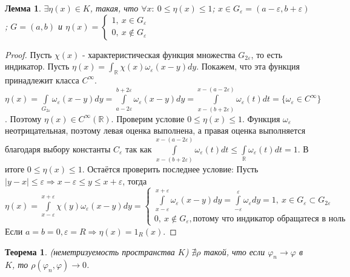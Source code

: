 \documentclass[9pt, a4paper]{article}
\newtheorem*{theorem}{Теорема}
\newtheorem*{lemma}{Лемма}
\begin{document}
			\begin{lemma}
				$\exists \eta(x) \in K$, такая, что $\forall x: \ 0 \leq \eta(x) \leq 1$; $x \in G_\varepsilon = (a- \varepsilon, b + \varepsilon)$; $G = (a,b)$ и $\eta(x) = \begin{cases}
					1, \ x \in G_\varepsilon \\
					0, \ x \notin G_\varepsilon
				\end{cases}$
			\end{lemma}
			\begin{proof}
				Пусть $\chi(x)$ - характеристическая функция множества $G_{2\varepsilon}$, то есть индикатор. Пусть $\eta(x) = \int_{\mathbb{R}} \chi(x) \omega_\varepsilon(x-y) dy$. Покажем, что эта функция принадлежит класса $C^\infty$. $\eta(x) = \int\limits_{G_{2\varepsilon}} \omega_{\varepsilon}(x-y) dy = \int\limits_{a-2\varepsilon}^{b + 2\varepsilon} \omega_{\varepsilon}(x-y) dy = \int\limits_{x - (b + 2\varepsilon)}^{x - (a - 2\varepsilon)} \omega_\varepsilon(t) dt = \{\omega_\varepsilon \in C^\infty\}$. Поэтому $\eta(x) \in C^\infty (\mathbb{R})$.\newline
				Проверим условие $0 \leq \eta(x) \leq 1$. Функция $\omega_\varepsilon$ неотрицательная, поэтому левая оценка выполнена, а правая оценка выполняется благодаря выбору константы $C_\varepsilon$ так как $\int\limits_{x - (b + 2\varepsilon)}^{x - (a - 2\varepsilon)} \omega_\varepsilon(t) dt \leq \int\limits_{\mathbb{R}} \omega_\varepsilon(t) dt  = 1$. В итоге $0 \leq \eta(x) \leq 1$.\newline
				Остаётся проверить последнее условие: Пусть $|y-x| \leq \varepsilon \Rightarrow x - \varepsilon \leq y \leq x + \varepsilon$, тогда $\eta(x) = \int\limits_{x - \varepsilon}^{x+\varepsilon} \chi(y) \omega_\varepsilon(x-y) dy = \begin{cases}
					\int\limits_{x-\varepsilon}^{x+\varepsilon} \omega_\varepsilon(x-y)dy = \int\limits_{-\varepsilon}^{\varepsilon} \omega_\varepsilon dy = 1, \ x \in G_\varepsilon \subset G_{2\varepsilon} \\
					0, \ x \notin G_\varepsilon, \text{потому что индикатор обращатеся в ноль}
				\end{cases}$
				Если $a=b=0, \varepsilon = R \Rightarrow \eta(x) = 1_R(x)$.
			\end{proof}
			\begin{theorem}
				(неметризуемость пространства $K$)\newline
				$\nexists \rho$ такой, что если $\varphi_n \to \varphi$ в $K$, то $\rho(\varphi_n, \varphi) \to 0$.
			\end{theorem}
\end{document}
